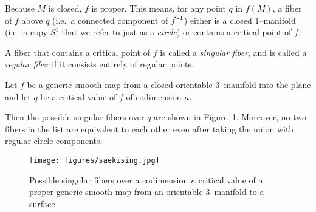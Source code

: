 \begin{defn}
	Because $M$ is closed, $f$ is proper.
	This means, for any point $q$ in $f(M)$, a fiber of $f$ above $q$ (i.e.\ a connected component of $f^{\,\text{-}1}$) either is a closed 1--manifold (i.e.\ a copy $S^1$ that we refer to just as a \emph{circle}) or contains a critical point of $f$.
	
	A fiber that contains a critical point of $f$ is called a \emph{singular fiber}, and is called a \emph{regular fiber} if it consists entirely of regular points.	
\end{defn}

\begin{theorem}
	\label{thm:saekising}
	Let $f$ be a generic smooth map from a closed orientable 3--manifold into the plane and let $q$ be a critical value of $f$ of codimension $\kappa$.
	
	Then the possible singular fibers over $q$ are shown in Figure~\ref{fig:saekising}.
	Moreover, no two fibers in the list are equivalent to each other even after taking the union with regular circle components.
\end{theorem}

	
\begin{figure}
	\centering
	\captionsetup{justification=centering}
	\caption{Possible singular fibers over a codimension $\kappa$ critical value of a proper generic smooth map from an orientable 3--manifold to a surface}
	\texttt{[image: figures/saekising.jpg]}
	\label{fig:saekising}
\end{figure}



%

